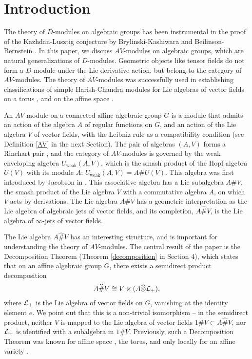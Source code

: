 \documentclass[12pt]{amsart}
\begin{document}
\section{Introduction}

The theory of $D$-modules on algebraic groups has been instrumental in the proof of the Kazhdan-Lusztig conjecture by Brylinski-Kashiwara and Beilinson-Bernstein \cite{BK, BB, H}. In this paper, we discuss $AV$-modules on algebraic groups, which are natural generalizations of $D$-modules. Geometric objects like tensor fields do not form a $D$-module under the Lie derivative action, but belong to the category of $AV$-modules.
The theory of $AV$-modules was successfully used in establishing classifications of simple Harish-Chandra modules for Lie algebras of vector fields on a torus \cite{BF0}, and on the affine space \cite{GS, XL}.

An $AV$-module on a connected affine algebraic group $G$ is a module that admits an action of the algebra $A$ of regular functions on $G$, and an action of the Lie algebra $V$ of vector fields, with the Leibniz rule as a compatibility condition (see Definition \ref{AV} in the next Section). The pair of algebras $(A, V)$ forms a Rinehart pair 
\cite{Ri}, and the category of $AV$-modules is governed by the weak enveloping algebra $U_\text{weak}(A, V)$, which is the smash product of the Hopf algebra $U(V)$ with its module $A$:  $U_\text{weak}(A, V)
= A \# U(V)$. This algebra was first introduced by Jacobson in \cite{Jac}. This associative algebra has a Lie subalgebra $A\#V$, the smash product of the Lie algebra $V$ with a commutative algebra $A$, on which $V$ acts by derivations. The Lie algebra $A\#V$ has a geometric interpretation as the Lie algebra of algebraic jets of vector fields, and its completion, $A\widehat\# V$, is the Lie algebra of $\infty$-jets of vector fields. 

The Lie algebra $A\widehat\# V$ has an interesting structure, and is important for understanding the theory of $AV$-modules. The central result of the paper is the Decomposition Theorem (Theorem \ref{decomposition} in Section 4), which states that on an affine algebraic group $G$, there exists a semidirect product decomposition 
$$A\widehat\# V \cong V \ltimes (A \widehat\otimes {\mathcal L}_+),$$
where ${\mathcal L}_+$ is the Lie algebra of vector fields on $G$, vanishing at the identity element $e$. 
We point out that this is a non-trivial isomorphism -- in the semidirect product, neither $V$ is mapped to the Lie algebra of vector fields $1 \# V \subset A\widehat\# V $, nor ${\mathcal L}_+$ is identified with a subalgebra in $1 \# V$. 
Previously, such a Decomposition Theorem was known for affine space \cite{XL, BIN}, the torus, and only locally for an affine variety \cite{BI}.
\end{document}
